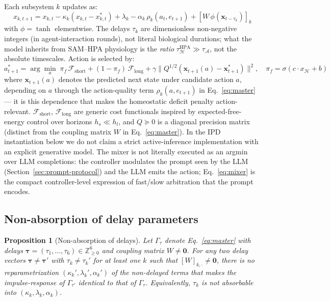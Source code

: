\documentclass{article}
\newtheorem{proposition}{Proposition}
\begin{document}
Each subsystem $k$ updates as:
\begin{equation}\label{eq:master}
\boxed{x_{k,t+1} = x_{k,t} - \kappa_k(x_{k,t}-x^{*}_{k,t}) + \lambda_k - \alpha_k\,\rho_k(a_t,e_{t+1}) + [W\,\phi(\mathbf{x}_{t-\tau_k})]_k}
\end{equation}
with $\phi = \tanh$ elementwise. The delays $\tau_k$ are dimensionless non-negative integers (in agent-interaction rounds), not literal biological durations; what the model inherits from SAM--HPA physiology is the \emph{ratio} $\tau_{\mathcal{H}}^{\mathrm{HPA}} \gg \tau_{\mathcal{A}}$, not the absolute timescales. Action is selected by:
\begin{equation}\label{eq:mixer}
a^{*}_{t+1} = \arg\min_a\; \pi_f\,\mathcal{F}_{\text{short}} + (1-\pi_f)\,\mathcal{F}_{\text{long}} + \gamma\|Q^{1/2}(\mathbf{x}_{t+1}(a) - \mathbf{x}^{*}_{t+1})\|^2, \quad \pi_f = \sigma(c \cdot x_{\mathcal{H}} + b)
\end{equation}
where $\mathbf{x}_{t+1}(a)$ denotes the predicted next state under candidate action $a$, depending on $a$ through the action-quality term $\rho_k(a, e_{t+1})$ in Eq.~\eqref{eq:master} --- it is this dependence that makes the homeostatic deficit penalty action-relevant. $\mathcal{F}_{\text{short}}$, $\mathcal{F}_{\text{long}}$ are generic cost functionals inspired by expected-free-energy control over horizons $h_s \ll h_l$, and $Q \succeq 0$ is a diagonal precision matrix (distinct from the coupling matrix $W$ in Eq.~\eqref{eq:master}). In the IPD instantiation below we do not claim a strict active-inference implementation with an explicit generative model. The mixer is not literally executed as an argmin over LLM completions: the controller modulates the prompt seen by the LLM (Section~\ref{sec:prompt-protocol}) and the LLM emits the action; Eq.~\eqref{eq:mixer} is the compact controller-level expression of fast/slow arbitration that the prompt encodes.

\subsection{Non-absorption of delay parameters}

\begin{proposition}[Non-absorption of delays]\label{prop:nonabsorption}
Let $\Gamma_\tau$ denote Eq.~\eqref{eq:master} with delays $\boldsymbol{\tau} = (\tau_1,\dots,\tau_6) \in \mathbb{Z}_{\geq 0}^6$ and coupling matrix $W \neq \mathbf{0}$. For any two delay vectors $\boldsymbol{\tau} \neq \boldsymbol{\tau}'$ with $\tau_k \neq \tau_k'$ for at least one $k$ such that $[W]_{k,\cdot} \neq \mathbf{0}$, there is no reparametrization $(\kappa_k',\lambda_k',\alpha_k')$ of the non-delayed terms that makes the impulse-response of $\Gamma_{\tau'}$ identical to that of $\Gamma_\tau$. Equivalently, $\tau_k$ is not absorbable into $(\kappa_k,\lambda_k,\alpha_k)$.
\end{proposition}
\end{document}
